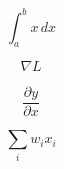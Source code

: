 
\begin{equation}\label{eq:integral}
\int_a^b x \, dx
\end{equation}

\begin{equation}\label{eq:grad}
\nabla L
\end{equation}

\begin{equation}\label{eq:partial}
\frac{\partial y}{\partial x}
\end{equation}

\begin{equation}\label{eq:innerprod}
\sum_i w_i x_i
\end{equation}
